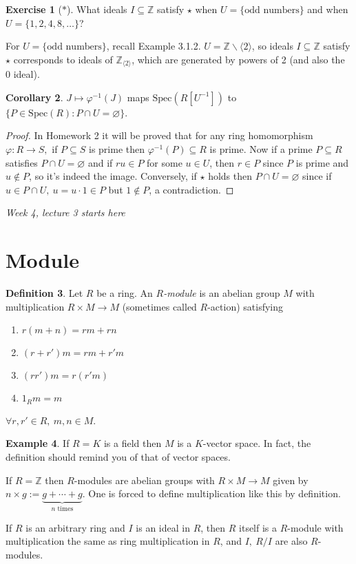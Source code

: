 \documentclass[a4paper]{article}
\newcommand{\Spec}{\text{Spec}}
\theoremstyle{definition}
\newtheorem{defn}{Definition}[subsection]
\newtheorem{coro}[defn]{Corollary}
\newtheorem{example}[defn]{Example}
\newtheorem{exe}[defn]{Exercise}
\begin{document}
\begin{exe}[$\ast$]
What ideals $I\subseteq \mathbb Z$ satisfy $\star$ when $U=\{\text{odd numbers}\}$ and when $U=\{1,2,4,8,\ldots\}$?

For $U=\{\text{odd numbers}\}$, recall Example 3.1.2. $U=\mathbb Z\backslash \langle2\rangle$, so ideals $I\subseteq \mathbb Z$ satisfy $\star$ corresponds to ideals of $\mathbb Z_{\langle 2\rangle}$, which are generated by powers of 2 (and also the 0 ideal).
\end{exe}

\begin{coro}
$J\mapsto \varphi^{-1}(J)$ maps $\Spec(R[U^{-1}])$ to $\{P\in\Spec(R):P\cap U=\varnothing\}$.
\end{coro}

\begin{proof}
In Homework 2 it will be proved that for any ring homomorphism $\varphi:R\rightarrow S,$ if $P\subseteq S$ is prime then $\varphi^{-1}(P)\subseteq R$ is prime. Now if a prime $P\subseteq R$ satisfies $P\cap U=\varnothing$ and if $ru\in P$ for some $u\in U$, then $r\in P$ since $P$ is prime and $u\notin P$, so it's indeed the image. Conversely, if $\star$ holds then $P\cap U=\varnothing$ since if $u\in P\cap U,\ u=u\cdot 1\in P$ but $1\notin P$, a contradiction.
\end{proof}

\begin{flushright}
\textit{Week 4, lecture 3 starts here}
\end{flushright}

\section{Module}
\begin{defn}
Let $R$ be a ring. An $R$\textit{-module} is an abelian group $M$ with multiplication $R\times M\rightarrow M$ (sometimes called $R$-action) satisfying
\begin{enumerate}
\item $r(m+n)=rm+rn$ 
\item $(r+r')m=rm+r'm$
\item $(rr')m=r(r'm)$
\item $1_R m=m$
\end{enumerate}
$\forall r,r'\in R,\ m,n\in M$.
\end{defn}

\begin{example}
If $R=K$ is a field then $M$ is a $K$-vector space. In fact, the definition should remind you of that of vector spaces.

If $R=\mathbb Z$ then $R$-modules are abelian groups with $R\times M\rightarrow M$ given by $n\times g:=\underbrace{g+\cdots+g}_{n\text{ times}}$. One is forced to define multiplication like this by definition.

If $R$ is an arbitrary ring and $I$ is an ideal in $R$, then $R$ itself is a $R$-module with multiplication the same as ring multiplication in $R$, and $I,\ R/I$ are also $R$-modules.
\end{example}
\end{document}
